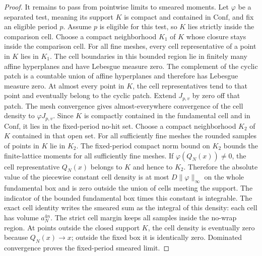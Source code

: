 \begin{proof}
It remains to pass from pointwise limits to smeared moments. Let $\varphi$ be
a separated test, meaning its support $K$ is compact and contained in
$\mathrm{Conf}$, and fix an eligible period $p$. Assume $p$ is eligible for this test, so $K$ lies strictly inside the
comparison cell. Choose a compact neighborhood $K_1$ of $K$ whose closure
stays inside the comparison cell. For all fine meshes, every cell representative of a point
in $K$ lies in $K_1$. The cell boundaries in this bounded region lie in finitely many affine
hyperplanes and have Lebesgue measure zero. The complement of the cyclic patch is a countable union of affine
hyperplanes and therefore has Lebesgue measure zero. At almost every point
in $K$, the cell representatives tend to that point and eventually belong to
the cyclic patch. Extend $J_{p,v}$ by zero off that patch. The mesh
convergence gives almost-everywhere convergence of the cell density to
$\varphi J_{p,v}$.
Since $K$ is compactly contained in the fundamental cell and in $\mathrm{Conf}$,
it lies in the fixed-period no-hit set. Choose a compact neighborhood $K_2$
of $K$ contained in that open set. For all sufficiently fine meshes the rounded samples of points
in $K$ lie in $K_2$. The fixed-period compact norm bound on $K_2$ bounds the finite-lattice
moments for all sufficiently fine meshes. If $\varphi(Q_N(x))\ne0$, the
cell representative $Q_N(x)$ belongs to $K$ and hence to $K_2$. Therefore the
absolute value of the piecewise constant cell density is at most
$D\|\varphi\|_\infty$ on the whole fundamental box and is zero outside
the union of cells meeting the support. The indicator of the bounded
fundamental box times this constant is integrable. The exact cell identity
writes the smeared sum as the integral of this density: each cell has volume
$a_N^{4n}$. The strict cell margin keeps all samples inside the no-wrap
region. At points outside the closed support $K$, the cell density is eventually zero because $Q_N(x)\to x$; outside the fixed box it is identically zero. Dominated convergence proves the fixed-period smeared limit.


\end{proof}
